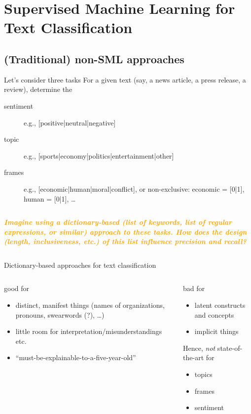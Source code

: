 \documentclass[compress]{beamer}
\newcommand{\question}[1]{
	\begin{frame}[plain]
		\begin{columns}
			\column{.3\textwidth}
			\makebox[\columnwidth]{
				\texttt{[image: mannetje.png]}}
			\column{.7\textwidth}
			\large
			\textcolor{orange}{\textbf{\emph{#1}}}
		\end{columns}
\end{frame}}
\begin{document}
\section{Supervised Machine Learning for Text Classification}

\subsection{(Traditional) non-SML approaches}

\begin{frame}{Let's consider three tasks}
	For a given text (say, a news article, a press release, a review), determine the
	\begin{description}
		\item[sentiment] e.g., [positive|neutral|negative]
		\item[topic] e.g., [sports|economy|politics|entertainment|other]
		\item[frames] e.g., [economic|human|moral|conflict], or non-exclusive: economic = [0|1], human = [0|1], \ldots
	\end{description}
\end{frame}




\question{Imagine using a dictionary-based (list of keywords, list of regular expressions, or similar) approach to these tasks. How does the design (length, inclusiveness, etc.) of this list influence precision and recall?}


\begin{frame}{Dictionary-based approaches for text classification}
	\begin{columns}[t]
		\begin{block}{good for}
			\begin{itemize}
				\item distinct, manifest things (names of organizations, pronouns, swearwords (?), \ldots)
				\item little room for interpretation/misunderstandings etc.
				\item ``must-be-explainable-to-a-five-year-old''
			\end{itemize}
			\pause
		\end{block}
		\begin{alertblock}{bad for}
			\begin{itemize}
				\item latent constructs and concepts
				\item implicit things
			\end{itemize}
			\pause
			Hence, \emph{not} state-of-the-art for
			\begin{itemize}
				\item topics
				\item frames
				\item sentiment
			\end{itemize}
		\end{alertblock}
	\end{columns}
\end{frame}
\end{document}
